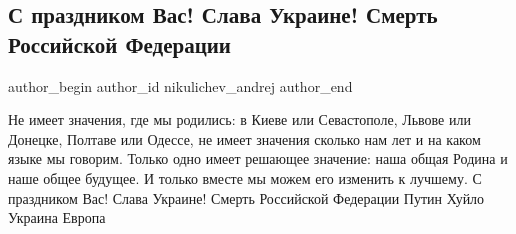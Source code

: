  
 
 
 
 
 
\subsection{С праздником Вас! Слава Украине! Смерть Российской Федерации}
\label{sec:24_08_2020.fb.nikulichev_andrej.1.nezalezhnist}
 
\ifcmt
 author_begin
   author_id nikulichev_andrej
 author_end
\fi

Не имеет значения, где мы родились: в Киеве или Севастополе, Львове или
Донецке, Полтаве или Одессе, не имеет значения сколько нам лет и на каком языке
мы говорим. Только одно имеет решающее значение: наша общая Родина и наше общее
будущее. И только вместе мы можем его изменить к лучшему. С праздником Вас!
Слава Украине! Смерть Российской Федерации Путин Хуйло Украина Европа
